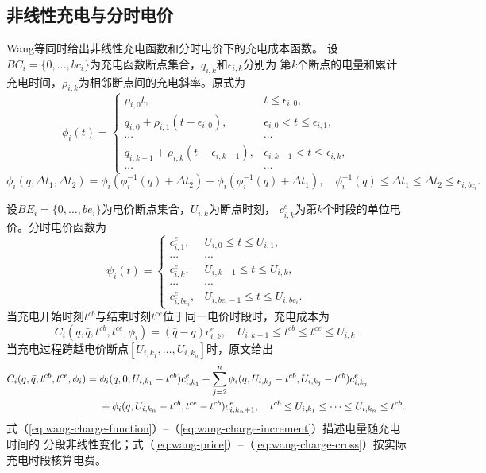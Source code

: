 \subsection{非线性充电与分时电价}

Wang等\cite{ref:94}同时给出非线性充电函数和分时电价下的充电成本函数。
设$BC_i=\{0,\ldots,bc_i\}$为充电函数断点集合，$q_{i,k}$和$\epsilon_{i,k}$分别为
第$k$个断点的电量和累计充电时间，$\rho_{i,k}$为相邻断点间的充电斜率。原式为
\begin{equation}
\phi_i(t)=
\begin{cases}
\rho_{i,0}t, & t\le\epsilon_{i,0},\\
q_{i,0}+\rho_{i,1}(t-\epsilon_{i,0}), & \epsilon_{i,0}<t\le\epsilon_{i,1},\\
\cdots & \cdots\\
q_{i,k-1}+\rho_{i,k}(t-\epsilon_{i,k-1}),
& \epsilon_{i,k-1}<t\le\epsilon_{i,k},\\
\cdots & \cdots
\end{cases}
\label{eq:wang-charge-function}
\end{equation}
\begin{equation}
\phi_i(q,\Delta t_1,\Delta t_2)
=\phi_i\!\left(\phi_i^{-1}(q)+\Delta t_2\right)
-\phi_i\!\left(\phi_i^{-1}(q)+\Delta t_1\right),
\quad
\phi_i^{-1}(q)\le\Delta t_1\le\Delta t_2\le\epsilon_{i,bc_i}.
\label{eq:wang-charge-increment}
\end{equation}

设$BE_i=\{0,\ldots,be_i\}$为电价断点集合，$U_{i,k}$为断点时刻，
$c_{i,k}^{e}$为第$k$个时段的单位电价。分时电价函数为
\begin{equation}
\psi_i(t)=
\begin{cases}
c_{i,1}^{e}, & U_{i,0}\le t\le U_{i,1},\\
\cdots & \cdots\\
c_{i,k}^{e}, & U_{i,k-1}\le t\le U_{i,k},\\
\cdots & \cdots\\
c_{i,be_i}^{e}, & U_{i,be_i-1}\le t\le U_{i,be_i}.
\end{cases}
\label{eq:wang-price}
\end{equation}
当充电开始时刻$t^{cb}$与结束时刻$t^{ce}$位于同一电价时段时，充电成本为
\begin{equation}
C_i(q,\bar q,t^{cb},t^{ce},\phi_i)
=(\bar q-q)c_{i,k}^{e},
\quad U_{i,k-1}\le t^{cb}\le t^{ce}\le U_{i,k}.
\label{eq:wang-charge-single}
\end{equation}
当充电过程跨越电价断点$[U_{i,k_1},\ldots,U_{i,k_n}]$时，原文给出
\begin{align}
C_i(q,\bar q,t^{cb},t^{ce},\phi_i)
={}&\phi_i(q,0,U_{i,k_1}-t^{cb})c_{i,k_1}^{e}
+\sum_{j=2}^{n}\phi_i(q,U_{i,k_j}-t^{cb},U_{i,k_j}-t^{cb})c_{i,k_j}^{e}\notag\\
&+\phi_i(q,U_{i,k_n}-t^{cb},t^{ce}-t^{cb})c_{i,k_n+1}^{e},
\quad t^{cb}\le U_{i,k_1}\le\cdots\le U_{i,k_n}\le t^{cb}.
\label{eq:wang-charge-cross}
\end{align}
式（\ref{eq:wang-charge-function}）--（\ref{eq:wang-charge-increment}）描述电量随充电时间的
分段非线性变化；式（\ref{eq:wang-price}）--（\ref{eq:wang-charge-cross}）按实际充电时段核算电费。

